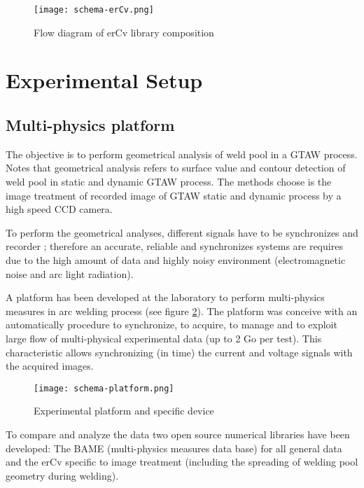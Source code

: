 \begin{Segmentation}
\begin{figure}
\begin{center}
\texttt{[image: schema-erCv.png]}
\caption{{\small Flow diagram of erCv library composition}}
\label{schema-erCv}
\end{center}
\end{figure}



\section{Experimental Setup}
\label{experimental_setup}

\subsection{Multi-physics platform}
\label{multi_physics_platform}

The objective is to perform geometrical analysis of weld pool
 in a GTAW process. Notes that geometrical analysis refers to
 surface value and contour detection of weld pool in static and 
dynamic GTAW process. The methods choose is the image treatment 
of recorded image of GTAW static and dynamic process by a high
 speed CCD camera.

To perform the geometrical analyses, different signals have to be 
synchronizes and recorder \cite{CHAPUIS}; therefore an accurate,
 reliable and synchronizes systems are requires due to the high
 amount of data and highly noisy environment (electromagnetic 
noise and arc light radiation). 

A platform has been developed at the laboratory to perform multi-physics
 measures in arc welding process (see figure \ref{schema-platform}). 
The platform was conceive with an automatically procedure to synchronize,
 to acquire, to manage and to exploit large flow of multi-physical
 experimental data (up to 2 Go per test). This characteristic allows
 synchronizing (in time) the current and voltage signals with 
the acquired images.

\begin{figure}
\begin{center}
\texttt{[image: schema-platform.png]}
\caption{{\small Experimental platform and specific device}}
\label{schema-platform}
\end{center}
\end{figure}

To compare and analyze the data two open source numerical libraries
 have been developed: The BAME (multi-physics measures data base)
 for all general data and the erCv specific to image treatment 
(including the spreading of welding pool geometry during welding).




\end{Segmentation}
